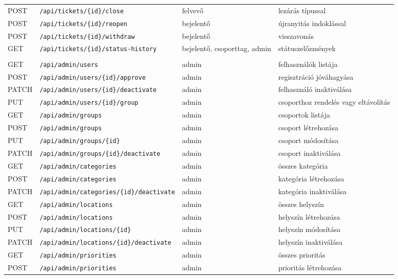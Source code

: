 \documentclass[12pt, a4paper, twoside]{article}
\begin{document}
{\begin{longtable}{>{\raggedright\arraybackslash}p{1.1cm}>{\raggedright\arraybackslash}p{6.9cm}>{\raggedright\arraybackslash}p{2.3cm}>{\raggedright\arraybackslash}p{4.3cm}}
    POST & \texttt{/api/tickets/\{id\}/close} & felvevő & lezárás típussal \\
    POST & \texttt{/api/tickets/\{id\}/reopen} & bejelentő & újranyitás indoklással \\
    POST & \texttt{/api/tickets/\{id\}/withdraw} & bejelentő & visszavonás \\
    GET & \texttt{/api/tickets/\{id\}/status-history} & bejelentő, csoporttag, admin & státuszelőzmények \\
    \midrule
    \multicolumn{4}{l}{\textbf{Adminisztráció}} \\
    GET & \texttt{/api/admin/users} & admin & felhasználók listája \\
    POST & \texttt{/api/admin/users/\{id\}/approve} & admin & regisztráció jóváhagyása \\
    PATCH & \texttt{/api/admin/users/\{id\}/deactivate} & admin & felhasználó inaktiválása \\
    PUT & \texttt{/api/admin/users/\{id\}/group} & admin & csoporthoz rendelés vagy eltávolítás \\
    GET & \texttt{/api/admin/groups} & admin & csoportok listája \\
    POST & \texttt{/api/admin/groups} & admin & csoport létrehozása \\
    PUT & \texttt{/api/admin/groups/\{id\}} & admin & csoport módosítása \\
    PATCH & \texttt{/api/admin/groups/\{id\}/deactivate} & admin & csoport inaktiválása \\
    GET & \texttt{/api/admin/categories} & admin & összes kategória \\
    POST & \texttt{/api/admin/categories} & admin & kategória létrehozása \\
    PATCH & \texttt{/api/admin/categories/\{id\}/deactivate} & admin & kategória inaktiválása \\
    GET & \texttt{/api/admin/locations} & admin & összes helyszín \\
    POST & \texttt{/api/admin/locations} & admin & helyszín létrehozása \\
    PUT & \texttt{/api/admin/locations/\{id\}} & admin & helyszín módosítása \\
    PATCH & \texttt{/api/admin/locations/\{id\}/deactivate} & admin & helyszín inaktiválása \\
    GET & \texttt{/api/admin/priorities} & admin & összes prioritás \\
    POST & \texttt{/api/admin/priorities} & admin & prioritás létrehozása \\

\end{longtable}}
\end{document}
